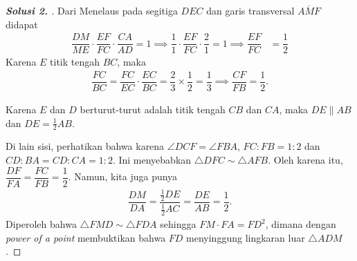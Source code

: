 \documentclass[letterpaper, 13pt]{scrartcl}
\begin{document}
\begin{proof}[\textbf{Solusi 2. }]
    Dari Menelaus pada segitiga $DEC$ dan garis transversal $\overline{AMF}$ didapat
    \begin{align*}
        \dfrac{DM}{ME}\cdot \dfrac{EF}{FC} \cdot \dfrac{CA}{AD} = 1 \implies
        \dfrac{1}{1}\cdot \dfrac{EF}{FC} \cdot \dfrac{2}{1} = 1 \implies
        \dfrac{EF}{FC} &= \dfrac{1}{2}
    \end{align*}
    Karena $E$ titik tengah $BC$, maka
    \begin{align*}
        \dfrac{FC}{BC} = \dfrac{FC}{EC} \cdot \dfrac{EC}{BC} = \dfrac{2}{3} \times \dfrac{1}{2} = \dfrac{1}{3} \implies \dfrac{CF}{FB} = \dfrac{1}{2}.
    \end{align*}

    Karena $E$ dan $D$ berturut-turut adalah  titik tengah $CB$ dan $CA$, maka $DE \parallel AB$ dan $DE= \frac{1}{2}AB$.

    Di lain sisi, perhatikan bahwa karena $\angle DCF = \angle FBA$, $FC:FB=1:2$ dan $CD:BA= CD:CA = 1:2$. Ini menyebabkan $\triangle DFC \sim \triangle AFB$. Oleh karena itu, $\dfrac{DF}{FA} = \dfrac{FC}{FB} = \dfrac{1}{2}$. Namun, kita juga punya
    \begin{align*}
        \dfrac{DM}{DA} = \dfrac{\frac{1}{2}DE}{\frac{1}{2}{AC}} = \dfrac{DE}{AB} = \dfrac{1}{2}.
    \end{align*}
    Diperoleh bahwa $\triangle FMD \sim \triangle FDA$ sehingga $FM \cdot FA = FD^2$, dimana dengan \textit{power of a point} membuktikan bahwa $FD$ menyinggung lingkaran luar $\triangle ADM$.

\end{proof}
\end{document}
